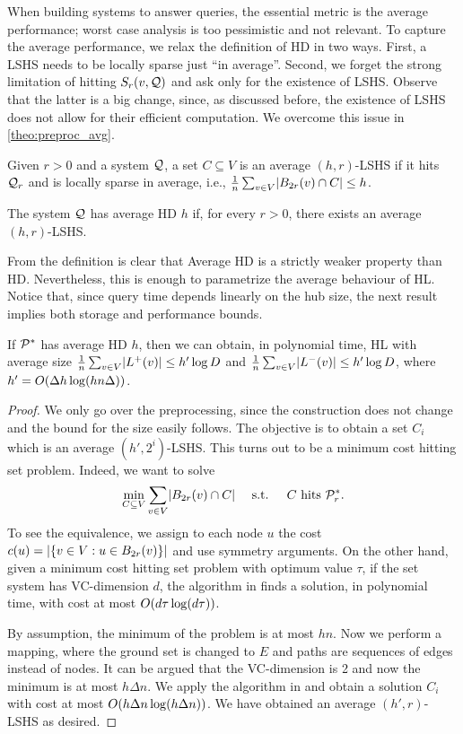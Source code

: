 When building systems to answer queries, the essential metric is the average performance; worst case analysis is too pessimistic and not relevant.
To capture the average performance, we relax the definition of HD in two ways.
First, a LSHS needs to be locally sparse just ``in average''.
Second, we forget the strong limitation of hitting $S_r(v,\mathcal{Q})$ and ask only for the existence of LSHS.
Observe that the latter is a big change, since, as discussed before, the existence of LSHS does not allow for their efficient computation.
We overcome this issue in \cref{theo:preproc_avg}.

\begin{definition}
Given $r>0$ and a system $\mathcal{Q}$, a set $C\subseteq V$ is an average $(h,r)$-LSHS if it hits $\mathcal{Q}_r$ and is locally sparse in average, i.e.,
$\frac{1}{n}\sum_{v\in V} \lvert B_{2r}(v)\cap C\rvert \leq h$.
\end{definition}

\begin{definition}[Average HD]
The system $\mathcal{Q}$ has average HD $h$ if, for every $r>0$, there exists an average $(h,r)$-LSHS.
\end{definition}

From the definition is clear that Average HD is a strictly weaker property than HD.
Nevertheless, this is enough to parametrize the average behaviour of HL.
Notice that, since query time depends linearly on the hub size, the next result implies both storage and performance bounds.

\begin{theorem}\label{theo:preproc_avg}
If $\mathcal{P}^*$ has average HD $h$, then we can obtain, in polynomial time, HL with average size 
$\frac{1}{n}\sum_{v\in V} \lvert L^+(v)\rvert \leq h'\log D$ and 
$\frac{1}{n}\sum_{v\in V} \lvert L^-(v)\rvert \leq h'\log D$,
where $h'=O(\Delta h\log (hn\Delta))$.
\end{theorem}
\begin{proof}
We only go over the preprocessing, since the construction does not change and the bound for the size easily follows. 
The objective is to obtain a set $C_i$ which is an average $(h',2^i)$-LSHS.
This turns out to be a minimum cost hitting set problem.
Indeed, we want to solve
\[
\min_{C\subseteq V} \sum_{v\in V}\lvert B_{2r}(v)\cap C\rvert  \quad \text{ s.t. } \quad C \text{ hits } \mathcal{P}^*_r.
\]
To see the equivalence, we assign to each node $u$ the cost $c(u)=\lvert\{v\in V: u\in B_{2r}(v)\}\rvert$ and use symmetry arguments.
On the other hand, given a minimum cost hitting set problem with optimum value $\tau$, if the set system has VC-dimension $d$, the algorithm in \cite{vc_dim_hitting} finds a solution, in polynomial time, with cost at most $O(d\tau\log(d\tau))$.

By assumption, the minimum of the problem is at most $hn$.
Now we perform a mapping, where the ground set is changed to $E$ and paths are sequences of edges instead of nodes.
It can be argued that the VC-dimension is 2 and now the minimum is at most $h\Delta n$.
We apply the algorithm in \cite{vc_dim_hitting} and obtain a solution $C_i$ with cost at most $O(h\Delta n\log(h\Delta n))$.
We have obtained an average $(h',r)$-LSHS as desired.
\end{proof}

